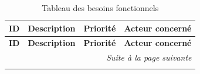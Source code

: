 \setlength{\LTleft}{0pt}
\setlength{\LTright}{0pt}
\renewcommand{\arraystretch}{1.3}
\begin{longtable}{|p{1.1cm}|p{5.5cm}|p{2cm}|p{3.5cm}|}
\caption{Tableau des besoins fonctionnels}
\label{tab:besoins-fonctionnels} \\
\hline
\textbf{ID} & \textbf{Description} & \textbf{Priorité} & \textbf{Acteur concerné} \\
\hline
\endfirsthead

\hline
\textbf{ID} & \textbf{Description} & \textbf{Priorité} & \textbf{Acteur concerné} \\
\hline
\endhead

\hline
\multicolumn{4}{r|}{\small\textit{Suite à la page suivante}} \\
\endfoot

\hline
\endlastfoot


\end{longtable}

